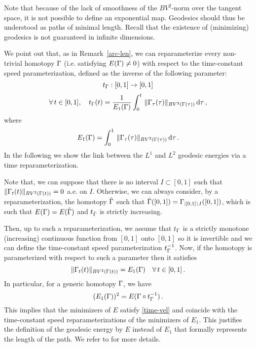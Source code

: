 Note that because of the lack of smoothness of the $BV^2$-norm over the tangent space, it is not possible to define an exponential map. Geodesics should thus be understood as paths of minimal length. Recall that the existence of (minimizing) geodesics is not guaranteed in infinite dimensions. 

\begin{rem}\label{time-param} 
We point out that, as in  Remark~\ref{arc-len}, we can reparameterize  every non-trivial  homotopy $\Gamma$ (i.e. satisfying $E(\Gamma) \neq 0$) with respect to the time-constant speed parameterization, defined as the inverse of the following parameter:
$$t_\Gamma : [0,1] \rightarrow [0,1]$$
$$\forall \, t\in [0,1], \quad 
	t_\Gamma(t) =\frac{1}{E_1(\Gamma)} \int_{0}^t \,\|\Gamma_\tau(\tau)\|_{BV^2(\Gamma(\tau))} \, \mathrm{d}\tau\,,$$
	where 
	$$E_1(\Gamma)=\int_{0}^1 \,\|\Gamma_\tau(\tau)\|_{BV^2(\Gamma(\tau))} \, \mathrm{d}\tau\,. $$
In the following we show the link between the $L^1$ and $L^2$ geodesic energies via a time reparameterization.

Note that, we can suppose that there is no interval $I\subset [0,1]$ such that 	$\|\Gamma_t(t)\|_{BV^2(\Gamma(t))}= 0$ a.e. on $I$. Otherwise,  we can always consider, by a  reparameterization,  the homotopy $\tilde{\Gamma}$ such that $\tilde{\Gamma}([0,1]) =\Gamma_{|[0,1]\setminus I}([0,1])$, which  is such that  $E(\Gamma)=E(\tilde{\Gamma})$ and $t_{\tilde{\Gamma}}$ is strictly increasing. 

Then, up to such a reparameterization, we assume that  $t_\Gamma$ is a strictly monotone (increasing) continuous function from $[0,1]$ onto $[0,1]$ so it is invertible and  we can define the time-constant speed parameterization $t_\Gamma^{-1}$. Now, if the homotopy is parameterized  with respect to such a  parameter then it satisfies
\begin{equation}\label{time-vel}
	\|\Gamma_t(t)\|_{BV^2(\Gamma(t))} = E_1(\Gamma)\quad \forall \, t\in [0,1]\,.
\end{equation} 
In particular, for a generic homotopy $\Gamma$,  we have 
$$(E_1(\Gamma))^2= E(\Gamma\circ t_{\Gamma}^{-1})\,.$$
This implies  that the minimizers of $E$ satisfy \eqref{time-vel} and coincide with the time-constant speed reparameterizations of the  minimizers of $E_1$.
 This  justifies  the definition of the geodesic energy by $E$ instead of $E_1$ that formally represents the length of the path.
We refer to  \cite[Theorem 8.18  and Corollary 8.19, p.175]{Younes-book}  for more details.
\end{rem}

